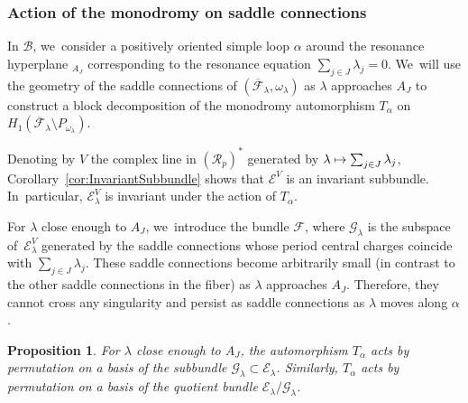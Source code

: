 \documentclass[JEP,XML,SOM,Unicode,NoFloatCountersInSection,published]{cedram}
\newcommand\mto{\mathchoice{\longmapsto}{\mapsto}{\mapsto}{\mapsto}}
\newtheorem{prop}[thm]{Proposition}
\theoremstyle{definition}
\begin{document}
\subsubsection{Action of the monodromy on saddle connections}

In $\mathcal{B}$, we~consider a positively oriented simple loop $\alpha$ around the resonance hyperplane $_{A_{J}}$ corresponding to the resonance equation $\sum_{j \in J} \lambda_{j} =0$. We~will use the geometry of the saddle connections of $(\overline{\mathcal{F}}_{\lambda},\omega_{\lambda})$ as $\lambda$ approaches $A_{J}$ to construct a block decomposition of the monodromy automorphism $T_{\alpha}$ on $H_{1}(\overline{\mathcal{F}}_{\lambda} \setminus P_{\omega_{\lambda}})$.

Denoting by $V$ the complex line in $(\mathcal{R}_{p})^{\ast}$ generated by $\lambda \mto \sum_{j \in J} \lambda_{j}$, Corollary~\ref{cor:InvariantSubbundle} shows that $\mathcal{E}^{V}$ is an invariant subbundle. In~particular, $\mathcal{E}_{\lambda}^{V}$ is invariant under the action of $T_{\alpha}$.

For $\lambda$ close enough to $A_{J}$, we~introduce the bundle $\mathcal{F}$, where $\mathcal{G}_{\lambda}$ is the subspace of~$\mathcal{E}_{\lambda}^{V}$ generated by the saddle connections whose period central charges coincide with $\sum_{j \in J} \lambda_{j}$. These saddle connections become arbitrarily small (in contrast to the other saddle connections in the fiber) as $\lambda$ approaches $A_{J}$. Therefore, they cannot cross any singularity and persist as saddle connections as $\lambda$ moves along $\alpha$.

\begin{prop}\label{prop:MonoSC}
For $\lambda$ close enough to $A_{J}$, the automorphism $T_{\alpha}$ acts by permutation on a basis of the subbundle $\mathcal{G}_{\lambda} \subset \mathcal{E}_{\lambda}$. Similarly, $T_{\alpha}$ acts by permutation on a basis of the quotient bundle $\mathcal{E}_{\lambda}/\mathcal{G}_{\lambda}$.
\end{prop}
\end{document}
